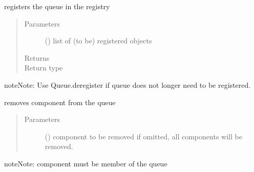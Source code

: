 \documentclass[letterpaper,10pt,english]{sphinxmanual}
\begin{document}
\begin{fulllineitems}

\begin{fulllineitems}
\label{\detokenize{Reference:salabim.Queue.register}}
registers the queue in the registry
\begin{quote}\begin{description}
\item[{Parameters}] \leavevmode
{} () \textendash{} list of (to be) registered objects

\item[{Returns}] \leavevmode
{}

\item[{Return type}] \leavevmode
{\hyperref[\detokenize{Reference:salabim.Queue}]{}}

\end{description}\end{quote}

\begin{sphinxadmonition}{note}{Note:}
Use Queue.deregister if queue does not longer need to be registered.
\end{sphinxadmonition}

\end{fulllineitems}


\begin{fulllineitems}
\label{\detokenize{Reference:salabim.Queue.remove}}
removes component from the queue
\begin{quote}\begin{description}
\item[{Parameters}] \leavevmode
{} ({\hyperref[\detokenize{Reference:salabim.Component}]{}}) \textendash{} component to be removed 
if omitted, all components will be removed.

\end{description}\end{quote}

\begin{sphinxadmonition}{note}{Note:}
component must be member of the queue
\end{sphinxadmonition}


\end{fulllineitems}
\end{fulllineitems}
\end{document}
